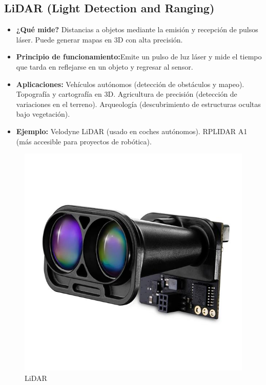 \subsection*{LiDAR (Light Detection and Ranging)}
\begin{itemize}
	\item \textbf{¿Qué mide?} Distancias a objetos mediante la emisión y recepción de pulsos láser.
	Puede generar mapas en 3D con alta precisión.
	\item \textbf{Principio de funcionamiento:}Emite un pulso de luz láser y mide el tiempo que tarda en reflejarse en un objeto y regresar al sensor.
	\item \textbf{Aplicaciones:} Vehículos autónomos (detección de obstáculos y mapeo).
	Topografía y cartografía en 3D.
	Agricultura de precisión (detección de variaciones en el terreno).
	Arqueología (descubrimiento de estructuras ocultas bajo vegetación).
	\item \textbf{Ejemplo:} Velodyne LiDAR (usado en coches autónomos).
	RPLIDAR A1 (más accesible para proyectos de robótica).
\end{itemize}
\begin{figure}[h]
	\centering
	\includegraphics[width=0.3\linewidth]{img/LiDAR}
	\caption{LiDAR}
	\label{fig:LiDAR}
\end{figure}